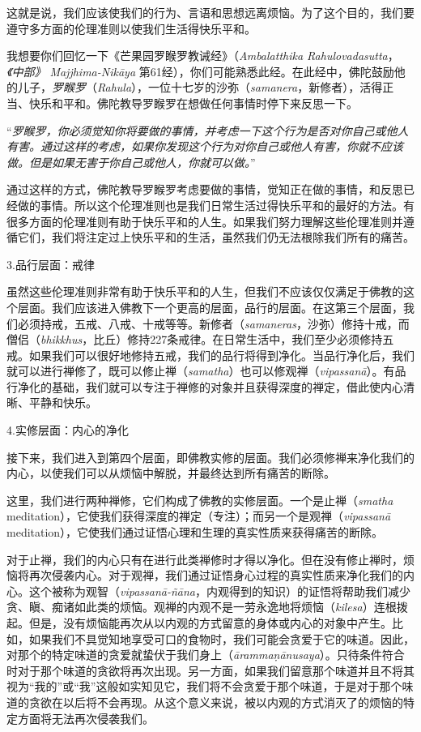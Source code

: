 \1这就是说，我们应该使我们的行为、言语和思想远离烦恼。为了这个目的，我们要遵守多方面的伦理准则以使我们生活得快乐平和。

我想要你们回忆一下《芒果园罗睺罗教诫经》（{\it Ambalatthika Rahulovadasutta}，{\it 《中部》 Majjhima-Nik\=aya} 第61经），你们可能熟悉此经。在此经中，佛陀鼓励他的儿子，{\it 罗睺罗}（{\it Rahula}），一位十七岁的沙弥（{\it samanera}，新修者），活得正当、快乐和平和。佛陀教导罗睺罗在想做任何事情时停下来反思一下。

“{\it 罗睺罗，你必须觉知你将要做的事情，并考虑一下这个行为是否对你自己或他人有害。通过这样的考虑，如果你发现这个行为对你自己或他人有害，你就不应该做。但是如果无害于你自己或他人，你就可以做。}”

通过这样的方式，佛陀教导罗睺罗考虑要做的事情，觉知正在做的事情，和反思已经做的事情。所以这个伦理准则也是我们日常生活过得快乐平和的最好的方法。有很多方面的伦理准则有助于快乐平和的人生。如果我们努力理解这些伦理准则并遵循它们，我们将注定过上快乐平和的生活，虽然我们仍无法根除我们所有的痛苦。

\sssubsectnon 3.品行层面：戒律

虽然这些伦理准则非常有助于快乐平和的人生，但我们不应该仅仅满足于佛教的这个层面。我们应该进入佛教下一个更高的层面，品行的层面。在这第三个层面，我们必须持戒，五戒、八戒、十戒等等。新修者（{\it samaneras}，沙弥）修持十戒，\1而僧侣（{\it bhikkhus}，比丘）修持227条戒律。在日常生活中，我们至少必须修持五戒。如果我们可以很好地修持五戒，我们的品行将得到净化。当品行净化后，我们就可以进行禅修了，既可以修止禅（{\it samatha}）也可以修观禅（{\it vipassan\=a}）。有品行净化的基础，我们就可以专注于禅修的对象并且获得深度的禅定，借此使内心清晰、平静和快乐。

\sssubsectnon 4.实修层面：内心的净化

接下来，我们进入到第四个层面，即佛教实修的层面。我们必须修禅来净化我们的内心，以使我们可以从烦恼中解脱，并最终达到所有痛苦的断除。

这里，我们进行两种禅修，它们构成了佛教的实修层面。一个是止禅（{\it smatha} meditation），它使我们获得深度的禅定（专注）；而另一个是观禅（{\it vipassan\=a} meditation），它使我们通过证悟心理和生理的真实性质来获得痛苦的断除。

对于止禅，我们的内心只有在进行此类禅修时才得以净化。但在没有修止禅时，烦恼将再次侵袭内心。对于观禅，我们通过证悟身心过程的真实性质来净化我们的内心。这个被称为观智（{\it vipassan\=a-\~n\=ana}，内观得到的知识）的证悟将帮助我们减少贪、瞋、痴诸如此类的烦恼。观禅的内观不是一劳永逸地将烦恼（{\it kilesa}）连根拨起。但是，没有烦恼能再次从以内观的方式留意的身体或内心的对象中产生。\1比如，如果我们不具觉知地享受可口的食物时，我们可能会贪爱于它的味道。因此，对那个的特定味道的贪爱就蛰伏于我们身上（{\it \=aramma\d n\=anusaya}）。只待条件符合时对于那个味道的贪欲将再次出现。另一方面，如果我们留意那个味道并且不将其视为“我的”或“我”这般如实知见它，我们将不会贪爱于那个味道，于是对于那个味道的贪欲在以后将不会再现。从这个意义来说，被以内观的方式消灭了的烦恼的特定方面将无法再次侵袭我们。

